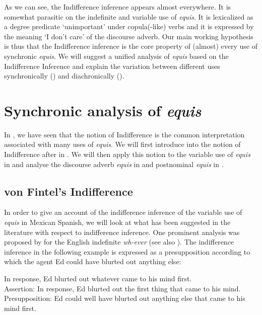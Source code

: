 \documentclass[output=paper
,modfonts
,nonflat]{langsci/langscibook}
\begin{document}
As we can see, the Indifference inference appears almost everywhere. It is somewhat parasitic on the indefinite and variable use of \textit{equis}. It is lexicalized as a degree predicate ‘unimportant’ under copula(-like) verbs and it is expressed by the meaning ‘I don’t care’ of the discourse adverb. Our main working hypothesis is thus that the Indifference inference is the core property of (almost) every use of synchronic \textit{equis}. We will suggest a unified analysis of \textit{equis} based on the Indifference Inference and explain the variation between different uses synchronically () and diachronically ().

\section{Synchronic analysis of \textit{equis}}\label{sec:kellert:3}
In , we have seen that the notion of Indifference is the common interpretation associated with many uses of \textit{equis}. We will first introduce into the notion of Indifference after \cite{Fintel2000} in . We will then apply this notion to the variable use of \textit{equis} in  and analyse the discourse adverb \textit{equis} in  and postnominal \textit{equis} in .

\subsection{von Fintel’s Indifference}\label{sec:kellert:3.1}
In order to give an account of the indifference inference of the variable use of \textit{equis} in Mexican Spanish, we will look at what has been suggested in the literature with respect to indifference inference. One prominent analysis was proposed by \citep{Fintel2000} for the English indefinite \textit{wh-ever} (see also \citealt{Condoravdi2005}). The indifference inference in the following example is expressed as a presupposition according to which the agent Ed could have blurted out anything else:

\ea In response, Ed blurted out whatever came to his mind first.\\
	Assertion: In response, Ed blurted out the first thing that came to his mind.\\
	Presupposition: Ed could well have blurted out anything else that came to his mind first.
\z
\end{document}
